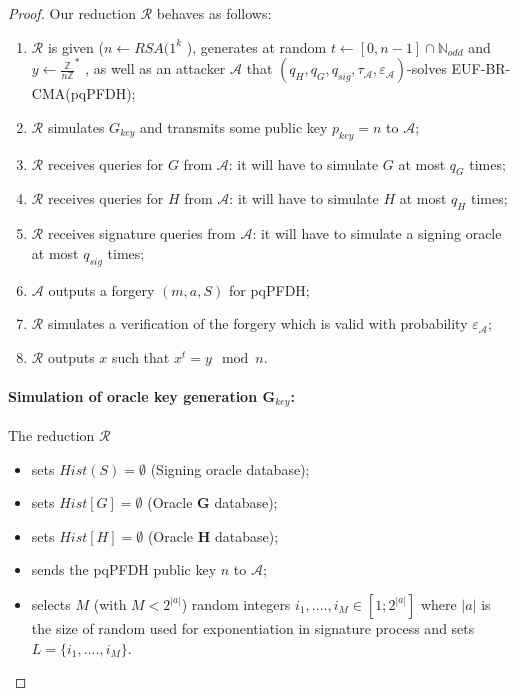 \documentclass[a4paper,11pt]{article}
\begin{document}
\begin{proof}

Our reduction $\mathcal{R}$ behaves as follows:
 \begin{enumerate}
  \item  $\mathcal{R}$ is given ($n \leftarrow RSA(1^{k}$ ), generates at random  $t \leftarrow [0, n-1]\cap \mathbb{N}_{odd}$  and $y
      \leftarrow \frac{\mathbb{Z}}{n\mathbb{Z}}^{*}$ , as well as an attacker $\mathcal{A}$ that    $(q_{H}, q_{G} , q_{sig} ,
      \tau_{\mathcal{A}} ,\varepsilon_{\mathcal{A}} )$-solves EUF-BR- CMA(pqPFDH);
 \item    $\mathcal{R}$ simulates $G_{key}$ and transmits some public key $p_{key}=n$ to  $\mathcal{A}$;
\item     $\mathcal{R}$ receives queries for $G$ from  $\mathcal{A}$: it will have to simulate $G$ at most $q_{G}$ times;
    \item     $\mathcal{R}$ receives queries for $H$ from  $\mathcal{A}$: it will have to simulate $H$ at most $q_{H}$ times;
\item     $\mathcal{R}$ receives signature queries from  $\mathcal{A}$: it will have to simulate a signing oracle at most $q_{sig}$ times;
\item     $\mathcal{A}$ outputs a forgery $(m, a, S)$ for pqPFDH;
 \item    $\mathcal{R}$ simulates a verification of the forgery which is valid with probability $\varepsilon_{\mathcal{A}}$;
 \item    $\mathcal{R}$ outputs $x$ such that $x^{t} = y \mod n$.
\end{enumerate}

\paragraph{Simulation of oracle key generation $\mathbf{G}_{key}$:} The reduction $\mathcal{R}$

\begin{itemize}
\item sets $Hist(S)=\emptyset$ (Signing oracle database);
 \item    sets $Hist [G] = \emptyset $ (Oracle $\mathbf{G}$ database);
  \item    sets $Hist [H] = \emptyset $ (Oracle $\mathbf{H}$ database);
 \item    sends the pqPFDH public key $n$ to $\mathcal{A}$;
 \item selects $M$ (with $M<2^{|a|}$) random integers  $i_{1},...., i_{M} \in [1; 2^{|a|}]$ where $|a|$ is the size
 of random  used for exponentiation in signature process and sets $L=\{i_{1},...., i_{M}\}$.
\end{itemize}


\end{proof}
\end{document}

